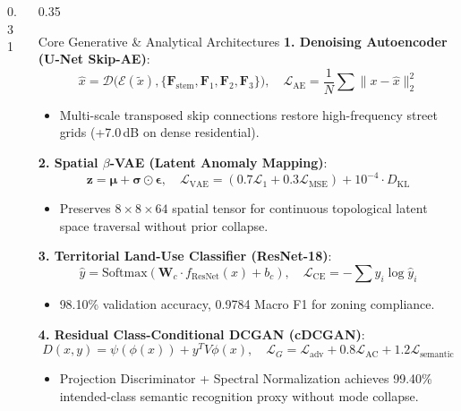 \documentclass[final]{beamer}
\begin{document}
\begin{frame}[t]
\begin{columns}[t]
\begin{column}{0.31\textwidth}
  \end{column}

  \begin{column}{0.35\textwidth}

    \begin{block}{Core Generative \& Analytical Architectures}
      \textbf{1. Denoising Autoencoder (U-Net Skip-AE)}:
      $$\hat{x} = \mathcal{D}\Big(\mathcal{E}(\tilde{x}), \{\mathbf{F}_{\text{stem}}, \mathbf{F}_1, \mathbf{F}_2, \mathbf{F}_3\}\Big), \quad \mathcal{L}_{\text{AE}} = \frac{1}{N}\sum \|x - \hat{x}\|_2^2$$
      \begin{itemize}
        \item Multi-scale transposed skip connections restore high-frequency street grids (+7.0\,dB on dense residential).
      \end{itemize}
      \vspace{0.4cm}

      \textbf{2. Spatial $\beta$-VAE (Latent Anomaly Mapping)}:
      $$\mathbf{z} = \boldsymbol{\mu} + \boldsymbol{\sigma} \odot \boldsymbol{\epsilon}, \quad \mathcal{L}_{\text{VAE}} = (0.7\mathcal{L}_1 + 0.3\mathcal{L}_{\text{MSE}}) + 10^{-4} \cdot D_{\text{KL}}$$
      \begin{itemize}
        \item Preserves $8 \times 8 \times 64$ spatial tensor for continuous topological latent space traversal without prior collapse.
      \end{itemize}
      \vspace{0.4cm}

      \textbf{3. Territorial Land-Use Classifier (ResNet-18)}:
      $$\hat{y} = \text{Softmax}(\mathbf{W}_c \cdot f_{\text{ResNet}}(x) + b_c), \quad \mathcal{L}_{\text{CE}} = -\sum y_i \log \hat{y}_i$$
      \begin{itemize}
        \item 98.10\% validation accuracy, 0.9784 Macro F1 for zoning compliance.
      \end{itemize}
      \vspace{0.4cm}

      \textbf{4. Residual Class-Conditional DCGAN (cDCGAN)}:
      $$D(x, y) = \psi(\phi(x)) + y^T V \phi(x), \quad \mathcal{L}_G = \mathcal{L}_{\text{adv}} + 0.8\mathcal{L}_{\text{AC}} + 1.2\mathcal{L}_{\text{semantic}}$$
      \begin{itemize}
        \item Projection Discriminator + Spectral Normalization achieves 99.40\% intended-class semantic recognition proxy without mode collapse.
      \end{itemize}
      \vspace{0.4cm}


\end{block}
\end{column}
\end{columns}
\end{frame}
\end{document}
